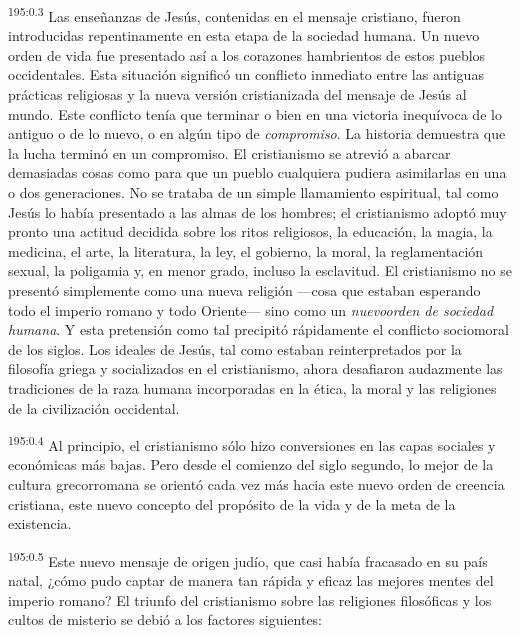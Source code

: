 \par
\textsuperscript{195:0.3} Las enseñanzas de Jesús, contenidas en el mensaje cristiano, fueron introducidas repentinamente en esta etapa de la sociedad humana. Un nuevo orden de vida fue presentado así a los corazones hambrientos de estos pueblos occidentales. Esta situación significó un conflicto inmediato entre las antiguas prácticas religiosas y la nueva versión cristianizada del mensaje de Jesús al mundo. Este conflicto tenía que terminar o bien en una victoria inequívoca de lo antiguo o de lo nuevo, o en algún tipo de \textit{compromiso}. La historia demuestra que la lucha terminó en un compromiso. El cristianismo se atrevió a abarcar demasiadas cosas como para que un pueblo cualquiera pudiera asimilarlas en una o dos generaciones. No se trataba de un simple llamamiento espiritual, tal como Jesús lo había presentado a las almas de los hombres; el cristianismo adoptó muy pronto una actitud decidida sobre los ritos religiosos, la educación, la magia, la medicina, el arte, la literatura, la ley, el gobierno, la moral, la reglamentación sexual, la poligamia y, en menor grado, incluso la esclavitud. El cristianismo no se presentó simplemente como una nueva religión ---cosa que estaban esperando todo el imperio romano y todo Oriente--- sino como un \textit{nuevoorden de sociedad humana}. Y esta pretensión como tal precipitó rápidamente el conflicto sociomoral de los siglos. Los ideales de Jesús, tal como estaban reinterpretados por la filosofía griega y socializados en el cristianismo, ahora desafiaron audazmente las tradiciones de la raza humana incorporadas en la ética, la moral y las religiones de la civilización occidental.

\par
\textsuperscript{195:0.4} Al principio, el cristianismo sólo hizo conversiones en las capas sociales y económicas más bajas. Pero desde el comienzo del siglo segundo, lo mejor de la cultura grecorromana se orientó cada vez más hacia este nuevo orden de creencia cristiana, este nuevo concepto del propósito de la vida y de la meta de la existencia.

\par
\textsuperscript{195:0.5} Este nuevo mensaje de origen judío, que casi había fracasado en su país natal, ¿cómo pudo captar de manera tan rápida y eficaz las mejores mentes del imperio romano? El triunfo del cristianismo sobre las religiones filosóficas y los cultos de misterio se debió a los factores siguientes:

